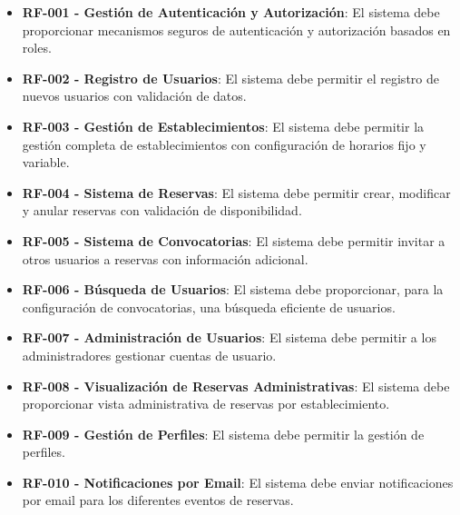 \begin{itemize}
\tightlist
\item
\textbf{RF-001 - Gestión de Autenticación y Autorización}: El sistema debe proporcionar mecanismos seguros de autenticación y autorización basados en roles.
\item
\textbf{RF-002 - Registro de Usuarios}: El sistema debe permitir el registro de nuevos usuarios con validación de datos.
\item
\textbf{RF-003 - Gestión de Establecimientos}: El sistema debe permitir la gestión completa de establecimientos con configuración de horarios fijo y variable.
\item
\textbf{RF-004 - Sistema de Reservas}: El sistema debe permitir crear, modificar y anular reservas con validación de disponibilidad.
\item
\textbf{RF-005 - Sistema de Convocatorias}: El sistema debe permitir invitar a otros usuarios a reservas con información adicional.
\item
\textbf{RF-006 - Búsqueda de Usuarios}: El sistema debe proporcionar, para la configuración de convocatorias, una búsqueda eficiente de usuarios.
\item
\textbf{RF-007 - Administración de Usuarios}: El sistema debe permitir a los administradores gestionar cuentas de usuario.
\item
\textbf{RF-008 - Visualización de Reservas Administrativas}: El sistema debe proporcionar vista administrativa de reservas por establecimiento.
\item
\textbf{RF-009 - Gestión de Perfiles}: El sistema debe permitir la gestión de perfiles.
\item
\textbf{RF-010 - Notificaciones por Email}: El sistema debe enviar notificaciones por email para los diferentes eventos de reservas.
\end{itemize}

